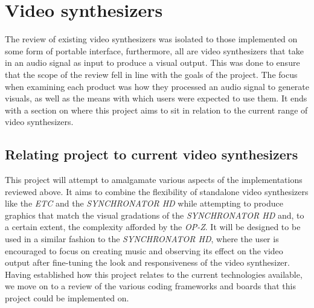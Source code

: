 \documentclass[../main_report2.tex]{subfiles}
\begin{document}
\section{Video synthesizers} \label{sec:vsynths}
The review of existing video synthesizers was isolated to those implemented on some form of portable interface, furthermore, all are video synthesizers that take in an audio signal as input to produce a visual output. This was done to ensure that the scope of the review fell in line with the goals of the project. The focus when examining each product was how they processed an audio signal to generate visuals, as well as the means with which users were expected to use them. It ends with a section on where this project aims to sit in relation to the current range of video synthesizers.




\subsection{Relating project to current video synthesizers}
This project will attempt to amalgamate various aspects of the implementations reviewed above. It aims to combine the flexibility of standalone video synthesizers like the \textit{ETC} and the \textit{SYNCHRONATOR HD} while attempting to produce graphics that match the visual gradations of the \textit{SYNCHRONATOR HD} and, to a certain extent, the complexity afforded by the \textit{OP-Z}. It will be designed to be used in a similar fashion to the \textit{SYNCHRONATOR HD}, where the user is encouraged to focus on creating music and observing its effect on the video output after fine-tuning the look and responsiveness of the video synthesizer. Having established how this project relates to the current technologies available, we move on to a review of the various coding frameworks and boards that this project could be implemented on.
\end{document}
